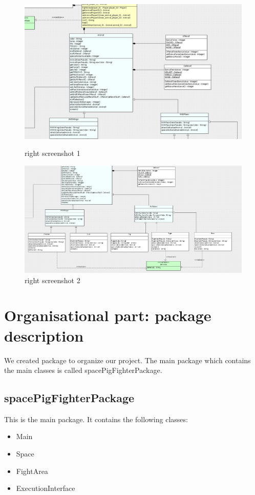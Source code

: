 \begin{figure}
  \includegraphics[width=450pt]{../../Images/2_2-3_2-3_3.png}
  \caption{\small right screenshot 1}
  \includegraphics[width=450pt]{../../Images/2_3-3_3.png}
  \caption{\small right screenshot 2}
\end{figure}


\section{Organisational part: package description}

We created package to organize our project. 
The main package which contains the main classes is called spacePigFighterPackage.

\subsection{spacePigFighterPackage}

This is the main package. It contains the following classes:
\begin{itemize}
 \item Main
 \item Space
 \item FightArea
 \item ExecutionInterface
\end{itemize}

